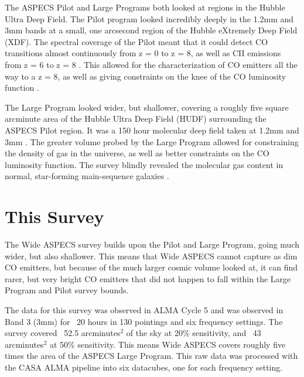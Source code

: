 The ASPECS Pilot and Large Programs both looked at regions in the Hubble Ultra Deep Field. The Pilot program looked incredibly deeply in the 1.2mm and 3mm bands at a small, one arcsecond region of the Hubble eXtremely Deep Field (XDF). The spectral coverage of the Pilot meant that it could detect CO transitions almost continuously from z = 0 to z = 8, as well as CII emissions from z = 6 to z = 8 \cite{walter2016alma}. This allowed for the characterization of CO emitters all the way to a z = 8, as well as giving constraints on the knee of the CO luminosity function \cite{walter2016alma}. 

The Large Program looked wider, but shallower, covering a roughly five square arcminute area of the Hubble Ultra Deep Field (HUDF) surrounding the ASPECS Pilot region. It was a 150 hour molecular deep field taken at 1.2mm and 3mm \cite{decarli2019alma}. The greater volume probed by the Large Program allowed for constraining the density of gas in the universe, as well as better constraints on the CO luminosity function. The survey blindly revealed the molecular gas content in normal, star-forming main-sequence galaxies \cite{decarli2019alma}. 

\section{This Survey}

The Wide ASPECS survey builds upon the Pilot and Large Program, going much wider, but also shallower. This means that Wide ASPECS cannot capture as dim CO emitters, but because of the much larger cosmic volume looked at, it can find rarer, but very bright CO emitters that did not happen to fall within the Large Program and Pilot survey bounds.

The data for this survey was observed in ALMA Cycle 5 and was observed in Band 3 (3mm) for ~20 hours in 130 pointings and six frequency settings. The survey covered ~52.5 arcminutes$^2$ of the sky at 20\% sensitivity, and ~43 arcminutes$^2$ at 50\% sensitivity. This means Wide ASPECS covers roughly five times the area of the ASPECS Large Program. This raw data was processed with the CASA ALMA pipeline into six datacubes, one for each frequency setting.

